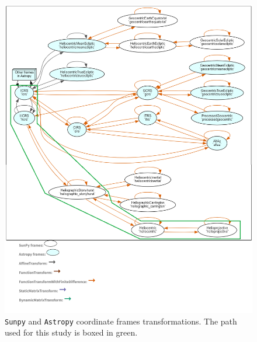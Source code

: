     \begin{figure}[H]
        \centering
        \includegraphics[width = 12cm]{report/Figures/methods/coordinates.png}
        \caption{\texttt{Sunpy} and \texttt{Astropy} coordinate frames transformations. The path used for this study is boxed in green.}
        \label{coordinates}
    \end{figure}

